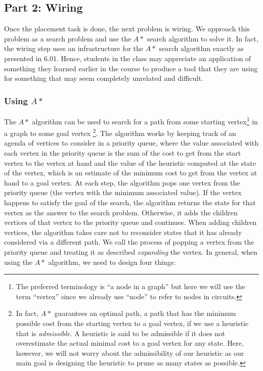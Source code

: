 \subsection{Part 2: Wiring}

Once the placement task is done, the next problem is wiring.
We approach this problem as a search problem and use the $A*$ search algorithm to
solve it. In fact, the wiring step uses an infrastructure for the $A*$ search
algorithm exactly as presented in 6.01. Hence, students in
the class may appreciate an application of something they learned
earlier in the course to produce a tool that they are using for something that
may seem completely unrelated and difficult.

\subsubsection{Using $A*$}

The $A*$ algorithm can be used to search for a path from some starting
vertex\footnote{The preferred terminology is ``a node in a graph'' but here we
will use the term ``vertex'' since we already use ``node'' to refer to nodes in
circuits.} in
a graph to some goal vertex \footnote{In fact, $A*$ guarantees an optimal path, a
path that has the minimum possible cost from the starting vertex to a goal
vertex, if we use a heuristic that is \emph{admissible}. A heuristic is said to
be admissible if it does not overestimate the actual minimal cost to a goal
vertex
for any state. Here, however, we will not worry about the admissibility of our
heuristic as our main goal is designing the heuristic to prune as many states as
possible.}. The algorithm works by keeping track of an agenda
of vertices to consider
in a priority queue, where the value associated with each vertex in the priority
queue is the sum of the cost to get from the start vertex to the vertex at hand
and the value of the heuristic
computed at the state of the vertex, which is an estimate of the minimum
cost to get from the vertex at hand to a goal vertex.
At each step, the algorithm pops
one vertex from the priority queue (the vertex with the minimum associated
value). If the vertex happens to satisfy the goal of
the search, the algorithm returns the state for that vertex as the answer to
the search
problem. Otherwise, it adds the children vertices of that vertex to the priority
queue and continues. When adding children vertices, the algorithm takes care not
to reconsider
states that it has already considered via a different path. We call the process
of popping a vertex from the priority queue and treating it as described
\emph{expanding} the vertex.
In general, when using the $A*$ algorithm, we need to design four things:

